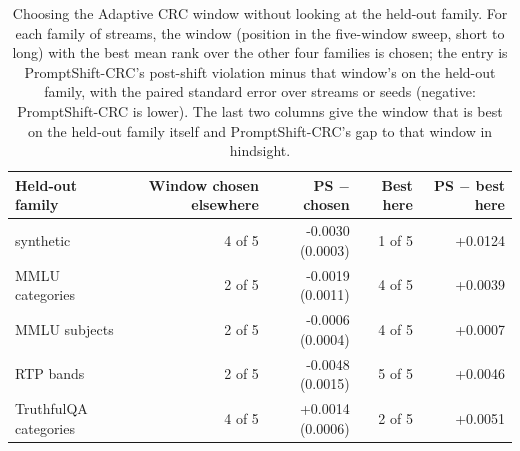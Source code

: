 \begin{table}[t]
\centering
\small
\caption{Choosing the Adaptive CRC window without looking at the held-out family. For each family of streams, the window (position in the five-window sweep, short to long) with the best mean rank over the other four families is chosen; the entry is PromptShift-CRC's post-shift violation minus that window's on the held-out family, with the paired standard error over streams or seeds (negative: PromptShift-CRC is lower). The last two columns give the window that is best on the held-out family itself and PromptShift-CRC's gap to that window in hindsight.}
\label{tab:lofo}
\begin{tabular}{lrrrr}
\toprule
Held-out family & Window chosen elsewhere & PS $-$ chosen & Best here & PS $-$ best here \\
\midrule
synthetic & 4 of 5 & -0.0030 (0.0003) & 1 of 5 & +0.0124 \\
MMLU categories & 2 of 5 & -0.0019 (0.0011) & 4 of 5 & +0.0039 \\
MMLU subjects & 2 of 5 & -0.0006 (0.0004) & 4 of 5 & +0.0007 \\
RTP bands & 2 of 5 & -0.0048 (0.0015) & 5 of 5 & +0.0046 \\
TruthfulQA categories & 4 of 5 & +0.0014 (0.0006) & 2 of 5 & +0.0051 \\
\bottomrule
\end{tabular}
\end{table}

